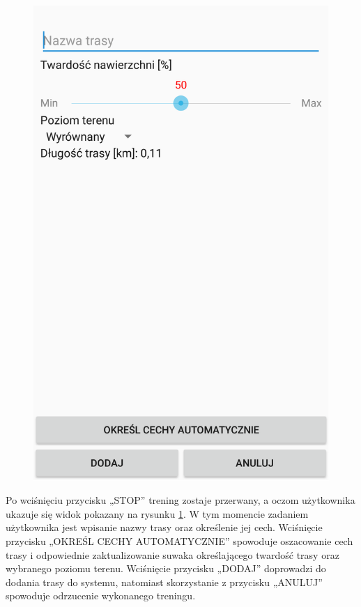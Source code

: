 \begin{figure}
\begin{minipage}{.5\textwidth}
  \includegraphics[width=.8\linewidth,frame]{img/cechy}
  \label{image:cechy-screen}
\end{minipage}
\end{figure}

Po wciśnięciu przycisku „STOP” trening zostaje przerwany, a oczom użytkownika ukazuje się widok pokazany na rysunku \ref{image:cechy-screen}. W tym momencie zadaniem użytkownika jest wpisanie nazwy trasy oraz określenie jej cech. Wciśnięcie przycisku „OKREŚL CECHY AUTOMATYCZNIE” spowoduje oszacowanie cech trasy i odpowiednie zaktualizowanie suwaka określającego twardość trasy oraz wybranego poziomu terenu. Wciśnięcie przycisku „DODAJ” doprowadzi do dodania trasy do systemu, natomiast skorzystanie z przycisku „ANULUJ” spowoduje odrzucenie wykonanego treningu.

